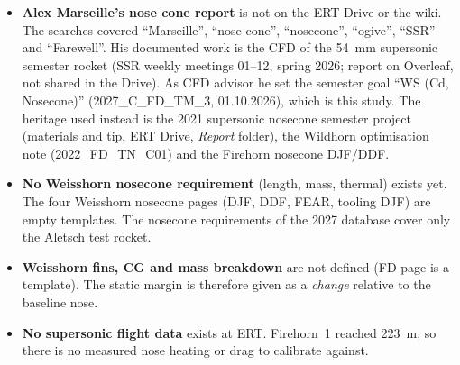 \begin{itemize}[leftmargin=*,itemsep=2pt]
\item \textbf{Alex Marseille's nose cone report} is not on the ERT Drive or the wiki. The searches
covered ``Marseille'', ``nose cone'', ``nosecone'', ``ogive'', ``SSR'' and ``Farewell''. His
documented work is the CFD of the \SI{54}{mm} supersonic semester rocket (SSR weekly meetings
01--12, spring 2026; report on Overleaf, not shared in the Drive). As CFD advisor he set the
semester goal ``WS (Cd, Nosecone)'' (2027\_C\_FD\_TM\_3, 01.10.2026), which is this study. The
heritage used instead is the 2021 supersonic nosecone semester project (materials and tip,
ERT Drive, \emph{Report} folder), the Wildhorn
optimisation note (2022\_FD\_TN\_C01) and the Firehorn nosecone DJF/DDF.
\item \textbf{No Weisshorn nosecone requirement} (length, mass, thermal) exists yet. The four
Weisshorn nosecone pages (DJF, DDF, FEAR, tooling DJF) are empty templates. The nosecone
requirements of the 2027 database cover only the Aletsch test rocket.
\item \textbf{Weisshorn fins, CG and mass breakdown} are not defined (FD page is a template).
The static margin is therefore given as a \emph{change} relative to the baseline nose.
\item \textbf{No supersonic flight data} exists at ERT. Firehorn~1 reached \SI{223}{m}, so there
is no measured nose heating or drag to calibrate against.
\end{itemize}
